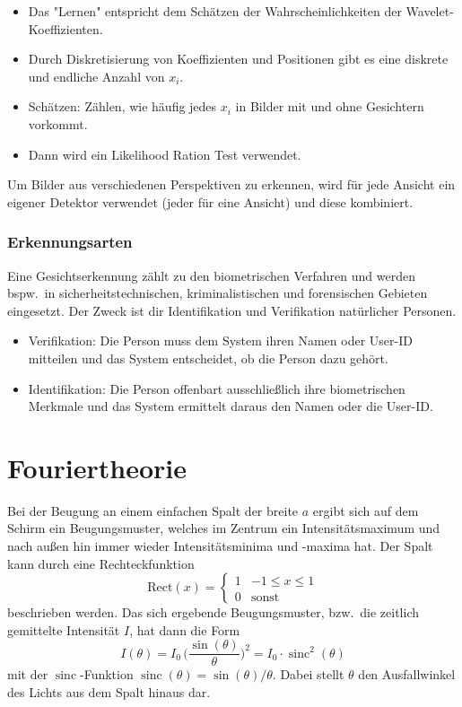 \documentclass[a4paper, 11pt, accentcolor = tud3b]{tudreport}
\DeclareMathOperator{\sinc}{sinc}
\newcommand{\bzw}{bzw.~}
\newcommand{\bspw}{bspw.~}
\begin{document}
\begin{enumerate}
\begin{itemize}
\begin{itemize}
								\end{itemize}
							\item Das "Lernen" entspricht dem Schätzen der Wahrscheinlichkeiten der Wavelet-Koeffizienten.
							\item Durch Diskretisierung von Koeffizienten und Positionen gibt es eine diskrete und endliche Anzahl von \(x_i\).
							\item Schätzen: Zählen, wie häufig jedes \(x_i\) in Bilder mit und ohne Gesichtern vorkommt.
							\item Dann wird ein Likelihood Ration Test verwendet.
						\end{itemize}
				\end{enumerate}
			
				Um Bilder aus verschiedenen Perspektiven zu erkennen, wird für jede Ansicht ein eigener Detektor verwendet (jeder für eine Ansicht) und diese kombiniert.

			\subsection{Erkennungsarten}
				Eine Gesichtserkennung zählt zu den biometrischen Verfahren und werden \bspw in sicherheitstechnischen, kriminalistischen und forensischen Gebieten eingesetzt. Der Zweck ist dir Identifikation und Verifikation natürlicher Personen.
				\begin{itemize}
					\item Verifikation: Die Person muss dem System ihren Namen oder User-ID mitteilen und das System entscheidet, ob die Person dazu gehört.
					\item Identifikation: Die Person offenbart ausschließlich ihre biometrischen Merkmale und das System ermittelt daraus den Namen oder die User-ID.
				\end{itemize}

	\chapter{Fouriertheorie}
		Bei der Beugung an einem einfachen Spalt der breite \(a\) ergibt sich auf dem Schirm ein Beugungsmuster, welches im Zentrum ein Intensitätsmaximum und nach außen hin immer wieder Intensitätsminima und -maxima hat. Der Spalt kann durch eine Rechteckfunktion
		\begin{equation*}
			\text{Rect}(x) =
				\begin{cases}
					1 & -1 \leq x \leq 1 \\
					0 & \text{sonst}
				\end{cases}
		\end{equation*}
		beschrieben werden. Das sich ergebende Beugungsmuster, \bzw die zeitlich gemittelte Intensität \(I\), hat dann die Form
		\begin{equation*}
			I(\theta) = I_0 \, \Bigg( \frac{\sin(\theta)}{\theta} \Bigg)^2 = I_0 \cdot \sinc^2(\theta)
		\end{equation*}
		mit der \(\sinc\)-Funktion \( \sinc(\theta) = \sin(\theta) / \theta \). Dabei stellt \(\theta\) den Ausfallwinkel des Lichts aus dem Spalt hinaus dar.
		
\end{document}
